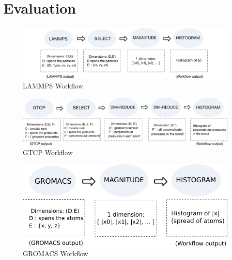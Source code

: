 \section{Evaluation}
\label{s:eval}

\begin{figure}
  \vspace{-0.10in}
  \includegraphics[width=\linewidth]{fig/wflow3}
  \vspace{-0.35in}
  \caption{LAMMPS Workflow}
  \label{fig:lammps-workflow}
  \vspace{-0.05in}
\end{figure}

\begin{figure}
  \includegraphics[width=\linewidth]{fig/wflow4}
  \vspace{-0.35in}
  \caption{GTCP Workflow}
  \label{fig:gtcp-workflow}
  \vspace{-0.15in}
\end{figure}

\begin{figure}
  \center
  \includegraphics[width=\columnwidth]{fig/wflow_gromacs}
  \vspace{-0.25in}
  \caption{GROMACS Workflow}
  \label{fig:gromacs-workflow}
\end{figure}

